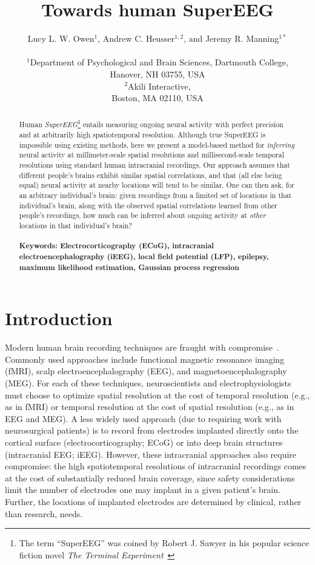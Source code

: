 \message{ !name(main.tex)}\documentclass[11pt]{article}
\title{Towards human SuperEEG}
\author{
  Lucy L. W. Owen$^{1}$,
  Andrew C. Heusser$^{1, 2}$, and
  Jeremy R. Manning$^{1\ast}$\\\\
$^{1}$Department of Psychological and Brain Sciences, Dartmouth College,\\
Hanover, NH 03755, USA\\
$^{2}$Akili Interactive,\\
Boston, MA 02110, USA}
\date{}
\begin{document}
 

 

\baselineskip24pt
\maketitle 

\begin{abstract}
  Human \textit{SuperEEG}\footnote{The term ``SuperEEG'' was coined by
    Robert J. Sawyer in his popular science fiction novel \textit{The
      Terminal Experiment}~\cite{Sawy95}} entails measuring ongoing
  neural activity with perfect precision and at arbitrarily high
  spatiotemporal resolution.  Although true SuperEEG is impossible
  using existing methods, here we present a model-based method for
  \textit{inferring} neural activity at millimeter-scale spatial
  resolutions and millisecond-scale temporal resolutions using
  standard human intracranial recordings.  Our approach assumes that
  different people's brains exhibit similar spatial correlations, and
  that (all else being equal) neural activity at nearby locations will
  tend to be similar.  One can then ask, for an arbitrary individual's
  brain: given recordings from a limited set of locations in that
  individual's brain, along with the observed spatial correlations
  learned from other people's recordings, how much can be inferred
  about ongoing activity at \textit{other} locations in that
  individual's brain?\\\\
  \footnotesize{\textbf{Keywords: Electrocorticography (ECoG),
      intracranial electroencephalography (iEEG), local field
      potential (LFP), epilepsy, maximum likelihood estimation,
      Gaussian process regression}}
\end{abstract}

\section*{Introduction}
Modern human brain recording techniques are fraught with
compromise~\citep{SejnEtal14}.  Commonly used approaches include
functional magnetic resonance imaging (fMRI), scalp
electroencephalography (EEG), and magnetoencephalography (MEG).  For
each of these techniques, neuroscientists and electrophysiologists
must choose to optimize spatial resolution at the cost of temporal
resolution (e.g., as in fMRI) or temporal resolution at the cost of
spatial resolution (e.g., as in EEG and MEG).  A less widely used
approach (due to requiring work with neurosurgical patients) is to
record from electrodes implanted directly onto the cortical surface
(electrocorticography; ECoG) or into deep brain structures
(intracranial EEG; iEEG).  However, these intracranial approaches also
require compromise: the high spatiotemporal resolutions of
intracranial recordings comes at the cost of substantially reduced
brain coverage, since safety considerations limit the number of
electrodes one may implant in a given patient's brain.  Further, the
locations of implanted electrodes are determined by clinical, rather
than research, needs.
\end{document}
